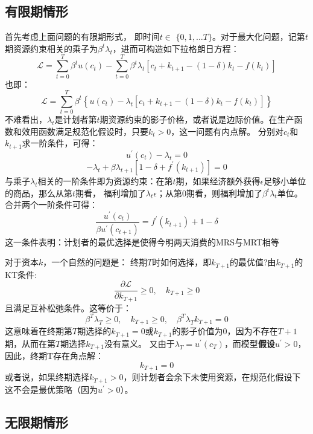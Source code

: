 \subsection{有限期情形} \label{subsec-finite-h}

首先考虑上面问题的有限期形式，
即时间$t \in$ $\{0,1, \ldots T\}$。对于最大化问题，记第$t$期资源约束相关的乘子为$\beta^t \lambda_t$，进而可构造如下拉格朗日方程：
$$
\mathcal{L}=\sum_{t=0}^T \beta^t u\left(c_t\right)-\sum_{t=0}^T \beta^t \lambda_t\left[c_t+k_{t+1}-(1-\delta) k_t-f\left(k_t\right)\right]
$$
也即：
$$
\mathcal{L}=\sum_{t=0}^T \beta^t\left\{u\left(c_t\right)-\lambda_t\left[c_t+k_{t+1}-(1-\delta) k_t-f\left(k_t\right)\right]\right\}
$$
不难看出，$\lambda_t$是计划者第$t$期资源约束的影子价格，或者说是边际价值。在生产函数和效用函数满足规范化假设时，只要$k_t>0$，这一问题有内点解。
分别对$c_t$和$k_{t+1}$求一阶条件，可得：
$$u^{\prime}\left(c_t\right)-\lambda_t=0$$
$$-\lambda_t+\beta\lambda_{t+1}\left[1-\delta+f^{\prime}\left(k_{t+1}\right)\right]=0$$
与乘子$\lambda_t$相关的一阶条件即为资源约束：在第$t$期，如果经济额外获得$\epsilon$足够小单位的商品，那么从第$t$期看，
福利增加了$\lambda_t\epsilon$；从第0期看，则福利增加了$\beta^t\lambda_t$单位。
合并两个一阶条件可得：
$$
\frac{u^{\prime}\left(c_t\right)}{\beta u^{\prime}\left(c_{t+1}\right)}=f^{\prime}\left(k_{t+1}\right)+1-\delta
$$
这一条件表明：计划者的最优选择是使得今明两天消费的MRS与MRT相等

对于资本$k$，一个自然的问题是：
终期$T$时如何选择，即$k_{T+1}$的最优值?由$k_{T+1}$的KT条件:
$$\frac{\partial \mathcal{L}}{\partial k_{T+1}} \geq 0, \quad k_{T+1} \geq 0$$
且满足互补松弛条件。这等价于：
$$
\beta^T \lambda_T \geq 0, \quad k_{T+1} \geq 0, \quad \beta^T \lambda_T k_{T+1}=0
$$
这意味着在终期第$T$期选择的$k_{T+1}=0$或$k_{T+1}$的影子价值为0，因为不存在$T+1$期，从而在第$T$期选择$k_{T+1}$没有意义。
又由于$\lambda_T=u^{\prime}\left(c_T\right)$，而模型\textbf{假设}$u^{\prime} > 0$，因此，终期T存在角点解：
$$k_{T+1}=0$$
或者说，如果终期选择$k_{T+1}>0$，则计划者会余下未使用资源，在规范化假设下这不会是最优策略（因为$u^{\prime}>0$）。

\subsection{无限期情形} \label{subsec-infinit-h}

